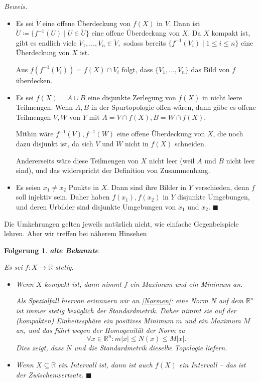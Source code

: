 \documentclass[12pt]{scrbook}   %
\newtheorem{Folgerung}[alles]{Folgerung}
\newcommand{\da}{\coloneqq}
\begin{document}
{\it Beweis.} 
\begin{itemize}
\item[a)] Es sei $\ddot V$ eine offene Überdeckung von $f(X)$ in $V.$ Dann
ist $\ddot U\da \{f^{-1}(U)\mid U\in \ddot U\}$ eine offene Überdeckung 
von $X.$ Da $X$ kompakt ist, gibt es endlich viele $V_1,\dots,V_n\in \ddot V,$
sodass bereits $\{f^{-1}(V_i)\mid 1\leq i\leq n\}$ eine Überdeckung von $X$ 
ist. 

Aus $f(f^{-1}(V_i)) = f(X)\cap V_i$ folgt, dass $\{V_1,\dots ,V_n\}$ das Bild
von $f$ überdecken.
\item[b)] Es sei $f(X) = A\cup B$ eine disjunkte Zerlegung von $f(X)$ in nicht 
leere Teilmengen. Wenn $A,B$ in der Spurtopologie offen wären, dann gäbe 
es offene Teilmengen $V,W$ von $Y$ mit $A=V\cap f(X), B=W\cap f(X).$

Mithin wäre $f^{-1}(V),f^{-1}(W)$ eine offene Überdeckung von $X$, die 
noch dazu disjunkt ist, da sich $V$ und $W$ nicht in $f(X)$ schneiden.

Andererseits wäre diese Teilmengen von $X$ nicht leer (weil $A$ und $B$ nicht
leer sind), und das widerspricht der Definition von Zusammenhang.

\item[c)] Es seien $x_1\neq x_2$ Punkte in $X.$ Dann sind ihre Bilder in $Y$ 
verschieden, denn $f$ soll injektiv sein. Daher haben $f(x_1),f(x_2)$ in $Y$ 
disjunkte Umgebungen, und deren Urbilder sind disjunkte Umgebungen von $x_1$ 
und $x_2.$ \hfill{$\blacksquare$}
\end{itemize}

Die Umkehrungen gelten jeweils natürlich nicht, wie einfache Gegenbeispiele 
lehren. Aber wir treffen bei näherem Hinsehen 

\begin{Folgerung} {\bf alte Bekannte}

Es sei $f:X\longrightarrow \mathbb R$ stetig.

\begin{itemize}
\item[a)]
Wenn $X$ kompakt ist, dann nimmt $f$ ein Maximum und ein Minimum an.

Als Spezialfall hiervon erinnnern wir an \ref{Normen}: eine Norm $N$ auf dem 
$\mathbb R^n$ ist immer stetig bezüglich der Standardmetrik. Daher nimmt sie 
auf der (kompakten) Einheitssphäre ein positives Minimum $m$ und ein Maximum
$M$ an, und das führt wegen der Homogenität der Norm zu
$$\forall x\in \mathbb R^n : m|x| \leq N(x) \leq M|x|.$$
Dies zeigt, dass $N$ und die Standardmetrik dieselbe Topologie liefern.
\item[b)]
Wenn $X\subseteq \mathbb R$ ein Intervall ist, dann ist auch $f(X)$ ein 
Intervall -- das ist der Zwischenwertsatz.
\phantom{.}\hfill{$\blacksquare$}
\end{itemize}
\end{Folgerung}
\end{document}
